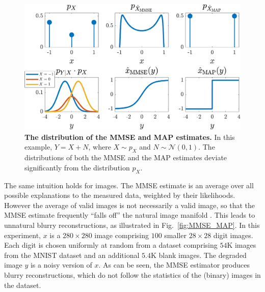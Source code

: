 \begin{figure}
	\begin{center}
        \includegraphics[width=\linewidth]{figures/exampleMAP.pdf}
	\end{center}
	\caption{\textbf{The distribution of the MMSE and MAP estimates.} In this example, $Y=X+N$, where $X \sim p_X$ and $N \sim \mathcal{N}(0,1)$. The distributions of both the MMSE and the MAP estimates deviate significantly from the distribution $p_X$.}
	\label{fig:exampleMAP}
\end{figure}


The same intuition holds for images. The MMSE estimate is an average over all possible explanations to the measured data, weighted by their likelihoods. However the average of valid images is not necessarily a valid image, so that the MMSE estimate frequently ``falls off'' the natural image manifold \cite{ledig2016photo}. This leads to unnatural blurry reconstructions, as illustrated in Fig.~\ref{fig:MMSE_MAP}. In this experiment, $x$ is a $280 \times 280$ image comprising $100$ smaller $28 \times 28$ digit images. Each digit is chosen uniformly at random from a dataset comprising $54$K images from the MNIST dataset \cite{MNIST} and an additional $5.4$K blank images. The degraded image $y$ is a noisy version of $x$. As can be seen, the MMSE estimator produces blurry reconstructions, which do not follow the statistics of the (binary) images in the dataset.


